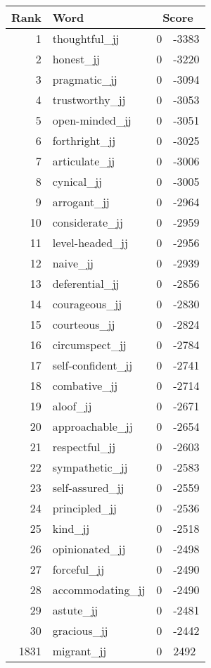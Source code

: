 \begin{longtable}[!htbp]{| rlr@{.}l |}
    \hline
    \textbf{Rank} & \textbf{Word} & \multicolumn{2}{c|}{\textbf{Score}} \\
    \hline
    \endhead
    1 & thoughtful\_jj & 0 & -3383 \\
    2 & honest\_jj & 0 & -3220 \\
    3 & pragmatic\_jj & 0 & -3094 \\
    4 & trustworthy\_jj & 0 & -3053 \\
    5 & open-minded\_jj & 0 & -3051 \\
    6 & forthright\_jj & 0 & -3025 \\
    7 & articulate\_jj & 0 & -3006 \\
    8 & cynical\_jj & 0 & -3005 \\
    9 & arrogant\_jj & 0 & -2964 \\
    10 & considerate\_jj & 0 & -2959 \\
    11 & level-headed\_jj & 0 & -2956 \\
    12 & naive\_jj & 0 & -2939 \\
    13 & deferential\_jj & 0 & -2856 \\
    14 & courageous\_jj & 0 & -2830 \\
    15 & courteous\_jj & 0 & -2824 \\
    16 & circumspect\_jj & 0 & -2784 \\
    17 & self-confident\_jj & 0 & -2741 \\
    18 & combative\_jj & 0 & -2714 \\
    19 & aloof\_jj & 0 & -2671 \\
    20 & approachable\_jj & 0 & -2654 \\
    21 & respectful\_jj & 0 & -2603 \\
    22 & sympathetic\_jj & 0 & -2583 \\
    23 & self-assured\_jj & 0 & -2559 \\
    24 & principled\_jj & 0 & -2536 \\
    25 & kind\_jj & 0 & -2518 \\
    26 & opinionated\_jj & 0 & -2498 \\
    27 & forceful\_jj & 0 & -2490 \\
    28 & accommodating\_jj & 0 & -2490 \\
    29 & astute\_jj & 0 & -2481 \\
    30 & gracious\_jj & 0 & -2442 \\
    1831 & migrant\_jj & 0 & 2492 \\

\end{longtable}
